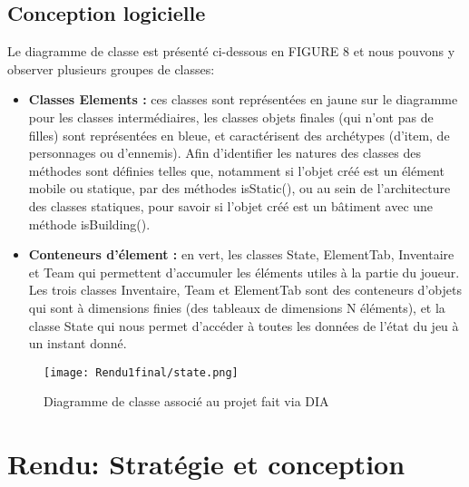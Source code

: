 \documentclass[a4paper,12pt]{article}
\begin{document}
\subsection{Conception logicielle}
Le diagramme de classe est présenté ci-dessous en FIGURE 8 et nous pouvons y observer plusieurs groupes de classes: 
\begin{itemize}
    \item \textbf{Classes Elements :} ces classes sont représentées en jaune sur le diagramme pour les classes intermédiaires, les classes objets finales (qui n'ont pas de filles) sont représentées en bleue, et caractérisent des archétypes (d'item, de personnages ou d'ennemis). Afin d'identifier les natures des classes des méthodes sont définies telles que, notamment si l'objet créé est un élément mobile ou statique, par des méthodes isStatic(), ou au sein de l'architecture des classes statiques, pour savoir si l'objet créé est un bâtiment avec une méthode isBuilding(). 
    \item \textbf{Conteneurs d'élement :} en vert, les classes State, ElementTab, Inventaire et Team qui permettent d'accumuler les éléments utiles à la partie du joueur. Les trois classes Inventaire, Team et ElementTab sont des conteneurs d'objets qui sont à dimensions finies (des tableaux de dimensions N éléments), et la classe State qui nous permet d'accéder à toutes les données de l'état du jeu à un instant donné. 
\end{itemize}

\begin{figure}[!ht]
  \centering
  \texttt{[image: Rendu1final/state.png]}
  \caption{Diagramme de classe associé au projet fait via DIA}
\end{figure}
\clearpage
\newpage
\section{Rendu: Stratégie et conception}
\end{document}
